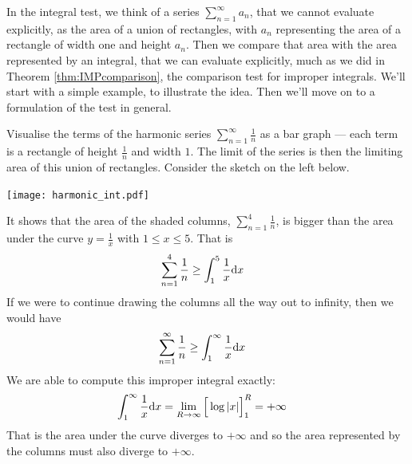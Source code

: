 In the integral test, we think of a series $\sum_{n=1}^\infty a_n$, that
we cannot evaluate explicitly, as the area of a union of rectangles,
with $a_n$ representing the area of a rectangle of width one and
height $a_n$. Then we compare that area with the area represented
by an integral, that we can evaluate explicitly, much as we did in
Theorem \ref{thm:IMPcomparison}, the comparison test for improper integrals.
We'll start with a simple example,  to illustrate the idea.
Then we'll move on to a formulation of the test in general.

\begin{eg}\label{eg:firstIntTest}
Visualise the terms of the harmonic series $\sum_{n=1}^\infty\frac{1}{n}$
as a bar graph --- each term is a rectangle of
height $\frac{1}{n}$ and width $1$. The limit of the series is then the limiting area of this union of rectangles. Consider the sketch
on the left below.
\begin{wfig}
 \begin{center}
  \texttt{[image: harmonic\_int.pdf]}
 \end{center}
\end{wfig}
It shows that the area of the shaded columns, $\sum_{n=1}^4\frac{1}{n}$,
is bigger than the area under the curve $y=\frac{1}{x}$ with
$1\le x\le 5$. That is
\begin{align*}
  \sum_{n=1}^4 \frac{1}{n}
  & \ge \int_1^5 \frac{1}{x}\mathrm{d}x
\end{align*}
If we were to continue drawing the columns all the way out to infinity,
then we would have
\begin{align*}
  \sum_{n=1}^\infty \frac{1}{n}
  & \ge \int_1^\infty \frac{1}{x}\mathrm{d}x
\end{align*}
We are able to compute this improper integral exactly:
\begin{align*}
  \int_1^\infty \frac{1}{x} \mathrm{d}x
  &= \lim_{R \to \infty} \Big[ \log|x| \Big]_1^R
  = +\infty
\end{align*}
That is the area under the curve diverges to $+\infty$ and so the area represented by the columns must also diverge to
$+\infty$.


\end{eg}
